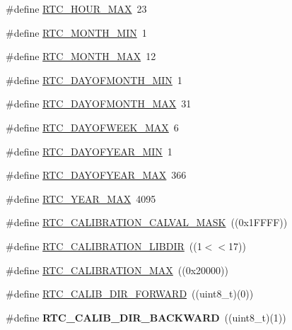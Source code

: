 \begin{DoxyCompactItemize}
\item 
\#define \hyperlink{group___r_t_c___private___macros_ga35630c42240ce2e8f74c38e1731d7e68}{\-R\-T\-C\-\_\-\-H\-O\-U\-R\-\_\-\-M\-A\-X}~23
\item 
\#define \hyperlink{group___r_t_c___private___macros_ga5002ab062a5871b7ed73c7ff0cb00e6b}{\-R\-T\-C\-\_\-\-M\-O\-N\-T\-H\-\_\-\-M\-I\-N}~1
\item 
\#define \hyperlink{group___r_t_c___private___macros_gacad40d1a94fd9b6884ec6160abb07674}{\-R\-T\-C\-\_\-\-M\-O\-N\-T\-H\-\_\-\-M\-A\-X}~12
\item 
\#define \hyperlink{group___r_t_c___private___macros_gafbcf1009356ffdad8f11920167908213}{\-R\-T\-C\-\_\-\-D\-A\-Y\-O\-F\-M\-O\-N\-T\-H\-\_\-\-M\-I\-N}~1
\item 
\#define \hyperlink{group___r_t_c___private___macros_gaddd515ae325f802e35e8202fef5f2957}{\-R\-T\-C\-\_\-\-D\-A\-Y\-O\-F\-M\-O\-N\-T\-H\-\_\-\-M\-A\-X}~31
\item 
\#define \hyperlink{group___r_t_c___private___macros_ga83c5c53e8b56ca8d48d9c46d7e8c50fa}{\-R\-T\-C\-\_\-\-D\-A\-Y\-O\-F\-W\-E\-E\-K\-\_\-\-M\-A\-X}~6
\item 
\#define \hyperlink{group___r_t_c___private___macros_ga132dcf308a59affe54749f4f11cd22a6}{\-R\-T\-C\-\_\-\-D\-A\-Y\-O\-F\-Y\-E\-A\-R\-\_\-\-M\-I\-N}~1
\item 
\#define \hyperlink{group___r_t_c___private___macros_ga2621bb8d69ee212101605c2e3739db4d}{\-R\-T\-C\-\_\-\-D\-A\-Y\-O\-F\-Y\-E\-A\-R\-\_\-\-M\-A\-X}~366
\item 
\#define \hyperlink{group___r_t_c___private___macros_ga72b68660aec4a924c12a124e2ec5f852}{\-R\-T\-C\-\_\-\-Y\-E\-A\-R\-\_\-\-M\-A\-X}~4095
\item 
\#define \hyperlink{group___r_t_c___private___macros_gafe263620e5d0709ddf51abfdf408c770}{\-R\-T\-C\-\_\-\-C\-A\-L\-I\-B\-R\-A\-T\-I\-O\-N\-\_\-\-C\-A\-L\-V\-A\-L\-\_\-\-M\-A\-S\-K}~((0x1\-F\-F\-F\-F))
\item 
\#define \hyperlink{group___r_t_c___private___macros_gae818a2f408ec0a1025ab3f02947d4b84}{\-R\-T\-C\-\_\-\-C\-A\-L\-I\-B\-R\-A\-T\-I\-O\-N\-\_\-\-L\-I\-B\-D\-I\-R}~((1$<$$<$17))
\item 
\#define \hyperlink{group___r_t_c___private___macros_gaeb077cfbe5f74f3b15ff72fed96abfe6}{\-R\-T\-C\-\_\-\-C\-A\-L\-I\-B\-R\-A\-T\-I\-O\-N\-\_\-\-M\-A\-X}~((0x20000))
\item 
\#define \hyperlink{group___r_t_c___private___macros_ga4f53042ce8b730a4b2c6eb40b856e4e8}{\-R\-T\-C\-\_\-\-C\-A\-L\-I\-B\-\_\-\-D\-I\-R\-\_\-\-F\-O\-R\-W\-A\-R\-D}~((uint8\-\_\-t)(0))
\item 
\hypertarget{group___r_t_c___private___macros_ga0a3b0243c2fd9528066365ef74c45cf4}{\#define {\bfseries \-R\-T\-C\-\_\-\-C\-A\-L\-I\-B\-\_\-\-D\-I\-R\-\_\-\-B\-A\-C\-K\-W\-A\-R\-D}~((uint8\-\_\-t)(1))}\label{group___r_t_c___private___macros_ga0a3b0243c2fd9528066365ef74c45cf4}


\end{DoxyCompactItemize}
